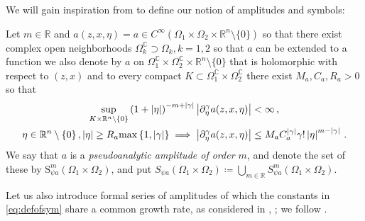 \documentclass[
	fontsize=11pt, 
	twoside=false, 
	abstract=true, 
	a4paper,
]{scrartcl}
\newcommand{\eps}{\varepsilon}
\newcommand{\sem}{\setminus\{0\}}
\newcommand{\RR}{\mathbb{R}}
\newcommand{\CC}{\mathbb{C}}
\newcommand{\abs}[1]{\left\lvert#1\right\rvert}
\newcommand{\del}{\partial}
\begin{document}
We will gain inspiration from \cite[Def.~18.7.1]{MR4436039} to define our notion of amplitudes and symbols:%
\begin{definition}%
	Let $m\in \RR$ and $a(z,x,\eta) = a \in C^\infty(\Omega_1\times\Omega_2\times\RR^n\sem)$ so that there exist complex open neighborhoods $\Omega_k^{\CC}\supset \Omega_k, k=1,2$ so that $a$ can be extended to a function we also denote by $a$ on $\Omega_1^{\CC}\times\Omega_2^{\CC}\times\RR^n\sem$ that is holomorphic with respect to $(z,x)$ and to every compact $K \subset \Omega_1^{\CC}\times\Omega_2^{\CC}$ there exist $M_a,C_a,R_a >0$ so that
	\begin{align}
		\sup_{K \times \RR^n\sem} \left(1+\abs{\eta}\right)^{-m+\abs{\gamma}}\abs{\del^\gamma_\eta a(z,x,\eta)} &< \infty\,,\notag\\%
		\label{eq:defofsym}
		\eta\in \RR^n\sem\,, \abs{\eta} \geq R_a\mathrm{max}\left\{1,\abs{\gamma}\right\} \implies \abs{\del^\gamma_\eta a(z,x,\eta)} &\leq M_a C_a^{\abs{\gamma}} \gamma! \abs{\eta}^{m-\abs{\gamma}}\,.
	\end{align}
	We say that $a$ is a \emph{pseudoanalytic amplitude of order $m$}, and denote the set of these by $\mathrm{S}^m_{\psi a}(\Omega_1\times\Omega_2)$, and put $S_{\psi a}(\Omega_1\times\Omega_2) \coloneqq \bigcup_{m\in \RR} S^m_{\psi a}(\Omega_1\times\Omega_2)$.
\end{definition}


Let us also introduce formal series of amplitudes of which the constants in \cref{eq:defofsym} share a common growth rate, as considered in \cite{zbMATH03310409}, \cite{AST_1982__95__R3_0}; we follow \cite[Def.~17.2.3]{MR4436039}.
\end{document}
